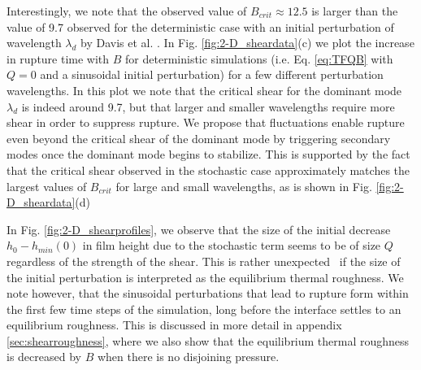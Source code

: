 \documentclass[
 onecolumn,
 amsmath,amssymb,
floatfix,superscriptaddress
]{revtex4-2}
\begin{document}
Interestingly, we note that the observed value of $B_{crit} \approx 12.5$ is  larger than the value of 9.7 observed for the deterministic case with an initial perturbation of wavelength $\lambda_d$ by Davis et al. \cite{davis_gratton_davis_2010}. In Fig. \ref{fig:2-D_sheardata}(c) we plot the increase in rupture time with $B$ for deterministic simulations (i.e. Eq. \eqref{eq:TFQB} with $Q=0$ and a sinusoidal initial perturbation) for a few different perturbation wavelengths. In this plot we note that the critical shear for the dominant mode $\lambda_d$ is indeed around 9.7, but that larger and smaller wavelengths require more shear in order to suppress rupture. We propose that fluctuations enable rupture even beyond the critical shear of the dominant mode by triggering secondary modes once the dominant mode begins to stabilize. This is supported by the fact that the critical shear observed in the stochastic case approximately matches the largest values of $B_{crit}$ for large and small wavelengths, as is shown in Fig. \ref{fig:2-D_sheardata}(d)

In Fig. \ref{fig:2-D_shearprofiles}, we observe that the size of the initial decrease $h_0-h_{min}(0)$ in film height due to the stochastic term seems to be of size $Q$ regardless of the strength of the shear. This is rather unexpected~\cite{ThiebaudBickel2015} if the size of the initial perturbation is interpreted as the equilibrium thermal roughness. We note however, that the sinusoidal perturbations that lead to rupture form within the first few time steps of the simulation, long before the interface settles to an equilibrium roughness. This is discussed in more detail in appendix \ref{sec:shearroughness}, where we also show that the equilibrium thermal roughness is decreased by $B$ when there is no disjoining pressure.
 
\end{document}
